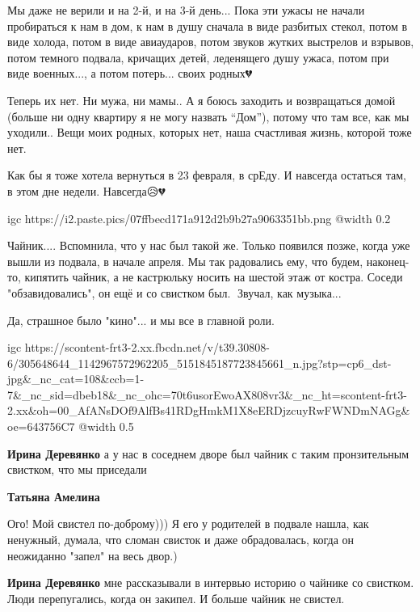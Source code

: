 Мы даже не верили и на 2-й, и на 3-й день... Пока эти ужасы не начали пробираться
к нам в дом, к нам в душу сначала в виде разбитых стекол, потом в виде
холода, потом в виде авиаударов, потом звуков жутких выстрелов и взрывов, потом
темного подвала, кричащих детей, леденящего душу ужаса, потом при виде
военных..., а потом потерь... своих родных💔

Теперь их нет. Ни мужа, ни мамы.. А я боюсь заходить и возвращаться домой (больше
ни одну квартиру я не могу назвать \enquote{Дом}), потому что там все, как мы
уходили.. Вещи моих родных, которых нет, наша счастливая жизнь, которой тоже нет.

Как бы я тоже хотела вернуться в 23 февраля, в срЕду. И навсегда остаться там,
в этом дне недели. Навсегда😥💔


\ifcmt
  igc https://i2.paste.pics/07ffbecd171a912d2b9b27a9063351bb.png
	@width 0.2
\fi


Чайник.... Вспомнила, что у нас был такой же. Только появился позже, когда уже
вышли из подвала, в начале апреля. Мы так радовались ему, что будем, наконец-то,
кипятить чайник, а не кастрюльку носить на шестой этаж от костра. Соседи
"обзавидовались", он ещё и со свистком был.🙂 Звучал, как музыка...

Да, страшное было "кино"... и мы все в главной роли.🥺

\ifcmt
  igc https://scontent-frt3-2.xx.fbcdn.net/v/t39.30808-6/305648644_1142967572962205_5151845187723845661_n.jpg?stp=cp6_dst-jpg&_nc_cat=108&ccb=1-7&_nc_sid=dbeb18&_nc_ohc=70t6usorEwoAX808vr3&_nc_ht=scontent-frt3-2.xx&oh=00_AfANsDOf9AlfBs41RDgHmkM1X8eERDjzcuyRwFWNDmNAGg&oe=643756C7
	@width 0.5
\fi

\begin{itemize} %
\textbf{Ирина Деревянко} а у нас в соседнем дворе был чайник с таким пронзительным свистком, что мы приседали

\textbf{Татьяна Амелина}

Ого! Мой свистел по-доброму))) Я его у родителей в подвале нашла, как ненужный,
думала, что сломан свисток и даже обрадовалась, когда он неожиданно "запел" на
весь двор.)

\textbf{Ирина Деревянко} мне рассказывали в интервью историю о чайнике со свистком. Люди перепугались, когда он закипел. И больше чайник не свистел.
\end{itemize} %

